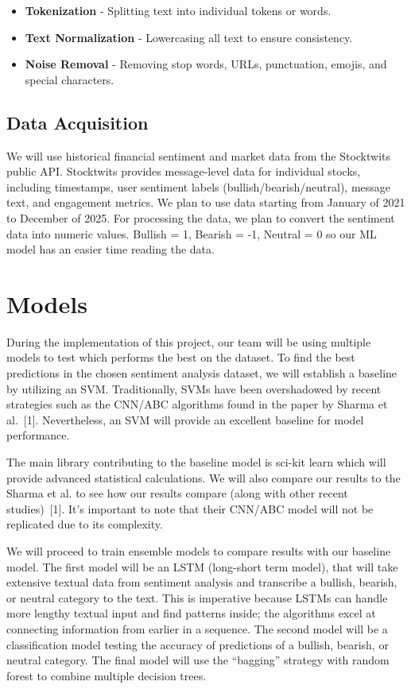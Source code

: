\documentclass[12pt, onecolumn, letterpaper]{IEEEtran}
\begin{document}
\begin{itemize}
    \item \textbf{Tokenization} - Splitting text into individual tokens or words.
    \item \textbf{Text Normalization} - Lowercasing all text to ensure consistency.
    \item \textbf{Noise Removal} - Removing stop words, URLs, punctuation, emojis, and special characters.
\end{itemize}

\subsection{Data Acquisition}
We will use historical financial sentiment and market data from the Stocktwits public API.
Stocktwits provides message-level data for individual stocks, including timestamps, user sentiment labels (bullish/bearish/neutral), message text, and engagement metrics.
We plan to use data starting from January of 2021 to December of 2025.
For processing the data, we plan to convert the sentiment data into numeric values.
Bullish = 1, Bearish = -1, Neutral = 0 so our ML model has an easier time reading the data.

\section{Models}
During the implementation of this project, our team will be using multiple models to test which performs the best on the dataset.
To find the best predictions in the chosen sentiment analysis dataset, we will establish a baseline by utilizing an SVM.
Traditionally, SVMs have been overshadowed by recent strategies such as the CNN/ABC algorithms found in the paper by Sharma et al.~[1].
Nevertheless, an SVM will provide an excellent baseline for model performance.

The main library contributing to the baseline model is sci-kit learn which will provide advanced statistical calculations.
We will also compare our results to the Sharma et al. to see how our results compare (along with other recent studies)~[1].
It’s important to note that their CNN/ABC model will not be replicated due to its complexity.

We will proceed to train ensemble models to compare results with our baseline model.
The first model will be an LSTM (long-short term model), that will take extensive textual data from sentiment analysis and transcribe a bullish, bearish, or neutral category to the text.
This is imperative because LSTMs can handle more lengthy textual input and find patterns inside; the algorithms excel at connecting information from earlier in a sequence.
The second model will be a classification model testing the accuracy of predictions of a bullish, bearish, or neutral category.
The final model will use the “bagging” strategy with random forest to combine multiple decision trees.
\end{document}
